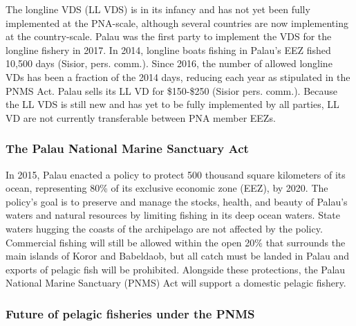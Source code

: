 \documentclass[11pt,english]{article}
\begin{document}
The longline VDS (LL VDS) is in its infancy and has not yet been fully implemented at the PNA-scale, although several countries are now implementing at the country-scale. Palau was the first party to implement the VDS for the longline fishery in 2017. In 2014, longline boats fishing in Palau’s EEZ fished 10,500 days (Sisior, pers. comm.). Since 2016, the number of allowed longline VDs has been a fraction of the 2014 days, reducing each year as stipulated in the PNMS Act. Palau sells its LL VD for \$150-\$250 (Sisior pers. comm.). Because the LL VDS is still new and has yet to be fully implemented by all parties, LL VD are not currently transferable between PNA member EEZs. 


\subsubsection{The Palau National Marine Sanctuary Act}

In 2015, Palau enacted a policy to protect 500 thousand square kilometers of its ocean, representing 80\% of its exclusive economic zone (EEZ), by 2020. The policy’s goal is to preserve and manage the stocks, health, and beauty of Palau’s waters and natural resources by limiting fishing in its deep ocean waters. State waters hugging the coasts of the archipelago are not affected by the policy. Commercial fishing will still be allowed within the open 20\% that surrounds the main islands of Koror and Babeldaob, but all catch must be landed in Palau and exports of pelagic fish will be prohibited. Alongside these protections, the Palau National Marine Sanctuary (PNMS) Act will support a domestic pelagic fishery.

\subsubsection{Future of pelagic fisheries under the PNMS}
\end{document}
